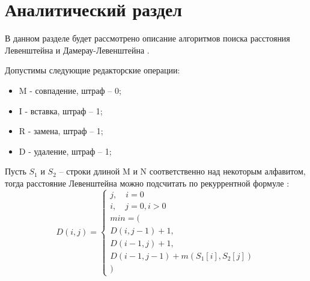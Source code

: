 \chapter{Аналитический раздел}
\label{cha:analysis}
В данном разделе будет рассмотрено описание алгоритмов поиска расстояния Левенштейна и Дамерау-Левенштейна \cite{Levenstein_online}.
\par Допустимы следующие редакторские операции:
\begin{itemize}
	\item M - совпадение, штраф -- 0;
	\item I - вставка, штраф -- 1;
	\item R - замена, штраф -- 1;
	\item D - удаление, штраф -- 1;
\end{itemize}
\par Пусть $ S_{1} $  и $ S_{2} $ -- строки длиной M и N соответственно над некоторым алфавитом, тогда расстояние Левенштейна можно подсчитать по рекуррентной формуле \cite{Levenstein}:
\begin{equation}
D(i, j) = \begin{cases}
j, \quad i = 0\\
i, \quad j = 0, i > 0\\
min = (\\
D(i,j-1) + 1,\\
D(i-1, j) + 1,\\
D(i-1, j-1)+m(S_{1}[i],S_{2}[j])\\
)
\end{cases}
\end{equation}

